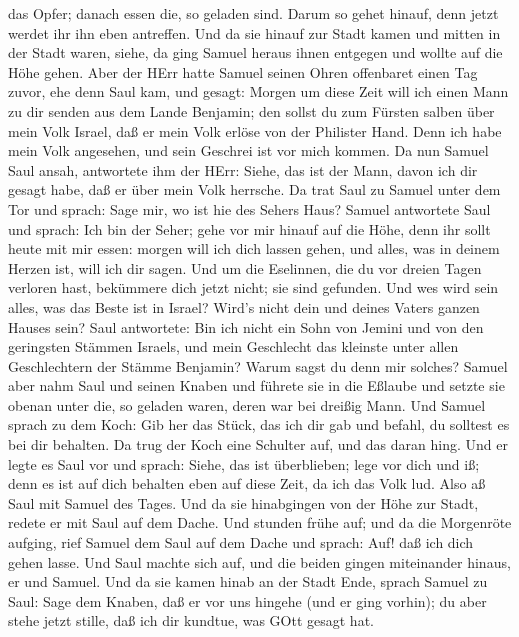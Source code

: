 das Opfer; danach essen die, so geladen sind. Darum so gehet hinauf,
denn jetzt werdet ihr ihn eben antreffen.  Und da sie
hinauf zur Stadt kamen und mitten in der Stadt waren, siehe, da ging
Samuel heraus ihnen entgegen und wollte auf die Höhe gehen.
 Aber der HErr hatte Samuel seinen Ohren offenbaret einen
Tag zuvor, ehe denn Saul kam, und gesagt:  Morgen um diese
Zeit will ich einen Mann zu dir senden aus dem Lande Benjamin; den
sollst du zum Fürsten salben über mein Volk Israel, daß er mein Volk
erlöse von der Philister Hand. Denn ich habe mein Volk angesehen, und
sein Geschrei ist vor mich kommen.  Da nun Samuel Saul
ansah, antwortete ihm der HErr: Siehe, das ist der Mann, davon ich dir
gesagt habe, daß er über mein Volk herrsche.  Da trat Saul
zu Samuel unter dem Tor und sprach: Sage mir, wo ist hie des Sehers
Haus?  Samuel antwortete Saul und sprach: Ich bin der
Seher; gehe vor mir hinauf auf die Höhe, denn ihr sollt heute mit mir
essen: morgen will ich dich lassen gehen, und alles, was in deinem
Herzen ist, will ich dir sagen.  Und um die Eselinnen, die
du vor dreien Tagen verloren hast, bekümmere dich jetzt nicht; sie sind
gefunden. Und wes wird sein alles, was das Beste ist in Israel? Wird's
nicht dein und deines Vaters ganzen Hauses sein?  Saul
antwortete: Bin ich nicht ein Sohn von Jemini und von den geringsten
Stämmen Israels, und mein Geschlecht das kleinste unter allen
Geschlechtern der Stämme Benjamin? Warum sagst du denn mir solches?
 Samuel aber nahm Saul und seinen Knaben und führete sie in
die Eßlaube und setzte sie obenan unter die, so geladen waren, deren war
bei dreißig Mann.  Und Samuel sprach zu dem Koch: Gib her
das Stück, das ich dir gab und befahl, du solltest es bei dir behalten.
 Da trug der Koch eine Schulter auf, und das daran hing.
Und er legte es Saul vor und sprach: Siehe, das ist überblieben; lege
vor dich und iß; denn es ist auf dich behalten eben auf diese Zeit, da
ich das Volk lud. Also aß Saul mit Samuel des Tages.  Und
da sie hinabgingen von der Höhe zur Stadt, redete er mit Saul auf dem
Dache.  Und stunden frühe auf; und da die Morgenröte
aufging, rief Samuel dem Saul auf dem Dache und sprach: Auf! daß ich
dich gehen lasse. Und Saul machte sich auf, und die beiden gingen
miteinander hinaus, er und Samuel.  Und da sie kamen hinab
an der Stadt Ende, sprach Samuel zu Saul: Sage dem Knaben, daß er vor
uns hingehe (und er ging vorhin); du aber stehe jetzt stille, daß ich
dir kundtue, was GOtt gesagt hat.

